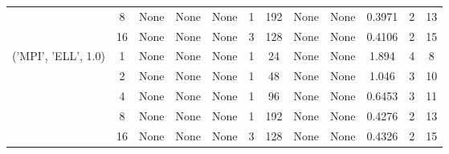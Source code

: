 \begin{tabular}{cccccccccccc}
& 8& None& None& None& 1& 192& None& None& 0.3971& 2& 13\\
& 16& None& None& None& 3& 128& None& None& 0.4106& 2& 15\\
\hline
\multirow{5}{*}{('MPI', 'ELL', 1.0)}& 1& None& None& None& 1& 24& None& None& 1.894& 4& 8\\
& 2& None& None& None& 1& 48& None& None& 1.046& 3& 10\\
& 4& None& None& None& 1& 96& None& None& 0.6453& 3& 11\\
& 8& None& None& None& 1& 192& None& None& 0.4276& 2& 13\\
& 16& None& None& None& 3& 128& None& None& 0.4326& 2& 15\\
\hline
\end{tabular}



